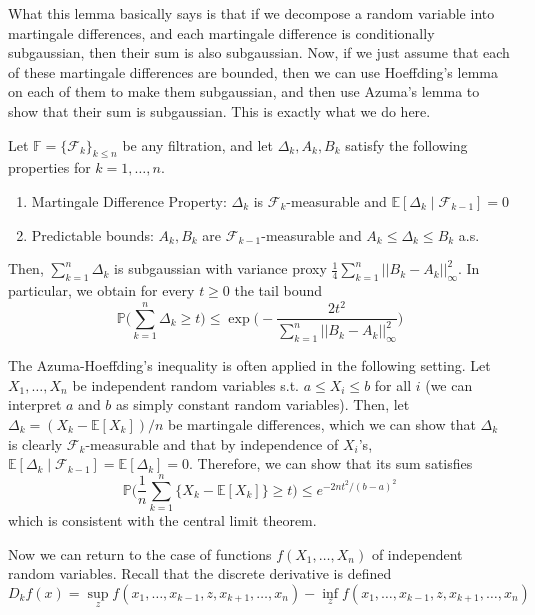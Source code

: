 \documentclass{article}
\begin{document}
  What this lemma basically says is that if we decompose a random variable into martingale differences, and each martingale difference is conditionally subgaussian, then their sum is also subgaussian. Now, if we just assume that each of these martingale differences are bounded, then we can use Hoeffding's lemma on each of them to make them subgaussian, and then use Azuma's lemma to show that their sum is subgaussian. This is exactly what we do here. 

  \begin{theorem}
  Let $\mathbb{F} = \{ \mathcal{F}_k \}_{k \leq n}$ be any filtration, and let $\Delta_k, A_k, B_k$ satisfy the following properties for $k = 1, \ldots, n$. 
  \begin{enumerate}
      \item Martingale Difference Property: $\Delta_k$ is $\mathcal{F}_k$-measurable and $\mathbb{E}[\Delta_k \mid \mathcal{F}_{k-1}] = 0$ 
      \item Predictable bounds: $A_k, B_k$ are $\mathcal{F}_{k-1}$-measurable and $A_k \leq \Delta_k \leq B_k$ a.s. 
  \end{enumerate}
  Then, $\sum_{k=1}^n \Delta_k$ is subgaussian with variance proxy $\frac{1}{4} \sum_{k=1}^n ||B_k - A_k||^2_\infty$. In particular, we obtain for every $t \geq 0$ the tail bound 
  \[\mathbb{P} \bigg( \sum_{k=1}^n \Delta_k \geq t \bigg) \leq \exp \bigg( - \frac{2t^2}{\sum_{k=1}^n ||B_k - A_k||_\infty^2} \bigg)\]
  \end{theorem}

  The Azuma-Hoeffding's inequality is often applied in the following setting. Let $X_1, \ldots, X_n$ be independent random variables s.t. $a \leq X_i \leq b$ for all $i$ (we can interpret $a$ and $b$ as simply constant random variables). Then, let $\Delta_k = (X_k - \mathbb{E}[X_k])/n$ be martingale differences, which we can show that $\Delta_k$ is clearly $\mathcal{F}_k$-measurable and that by independence of $X_i$'s,  $\mathbb{E}[\Delta_k \mid \mathcal{F}_{k-1}] = \mathbb{E}[\Delta_k] = 0$. Therefore, we can show that its sum satisfies
  \[\mathbb{P} \bigg( \frac{1}{n} \sum_{k=1}^n \{X_k - \mathbb{E}[X_k]\} \geq t \bigg) \leq e^{-2n t^2 / (b - a)^2}\]
  which is consistent with the central limit theorem. 

  Now we can return to the case of functions $f(X_1, \ldots, X_n)$ of independent random variables. Recall that the discrete derivative is defined 
  \[D_k f(x) = \sup_z f(x_1, \ldots, x_{k-1}, z, x_{k+1}, \ldots, x_n) - \inf_z f(x_1, \ldots, x_{k-1}, z, x_{k+1}, \ldots, x_n)\]
\end{document}
